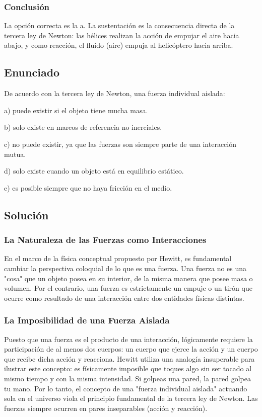 \documentclass[12pt]{article}
\begin{document}
\subsubsection*{Conclusión}
La opción correcta es la a. La sustentación es la consecuencia directa de la tercera ley de Newton: las hélices realizan la acción de empujar el aire hacia abajo, y como reacción, el fluido (aire) empuja al helicóptero hacia arriba.

\newpage

\subsection*{Enunciado}
De acuerdo con la tercera ley de Newton, una fuerza individual aislada:

a) puede existir si el objeto tiene mucha masa.

b) solo existe en marcos de referencia no inerciales.

c) no puede existir, ya que las fuerzas son siempre parte de una interacción mutua.

d) solo existe cuando un objeto está en equilibrio estático.

e) es posible siempre que no haya fricción en el medio.

\subsection*{Solución}

\subsubsection*{La Naturaleza de las Fuerzas como Interacciones}
En el marco de la física conceptual propuesto por Hewitt, es fundamental cambiar la perspectiva coloquial de lo que es una fuerza. Una fuerza no es una "cosa" que un objeto posea en su interior, de la misma manera que posee masa o volumen. Por el contrario, una fuerza es estrictamente un empuje o un tirón que ocurre como resultado de una interacción entre dos entidades físicas distintas. 

\subsubsection*{La Imposibilidad de una Fuerza Aislada}
Puesto que una fuerza es el producto de una interacción, lógicamente requiere la participación de al menos dos cuerpos: un cuerpo que ejerce la acción y un cuerpo que recibe dicha acción y reacciona. Hewitt utiliza una analogía insuperable para ilustrar este concepto: es físicamente imposible que toques algo sin ser tocado al mismo tiempo y con la misma intensidad. Si golpeas una pared, la pared golpea tu mano. Por lo tanto, el concepto de una "fuerza individual aislada" actuando sola en el universo viola el principio fundamental de la tercera ley de Newton. Las fuerzas siempre ocurren en pares inseparables (acción y reacción).
\end{document}
